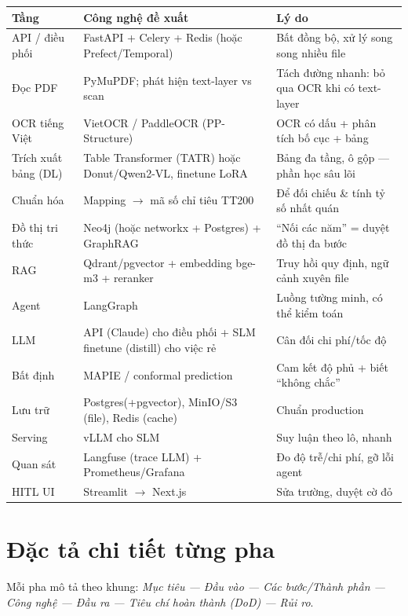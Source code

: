 \documentclass[11pt,a4paper]{article}
\begin{document}
\renewcommand{\arraystretch}{1.25}
\begin{longtable}{>{\raggedright\arraybackslash}p{3.6cm} >{\raggedright\arraybackslash}p{6.4cm} >{\raggedright\arraybackslash}p{5.0cm}}
\toprule
\textbf{Tầng} & \textbf{Công nghệ đề xuất} & \textbf{Lý do} \\
\midrule
\endhead
API / điều phối & FastAPI + Celery + Redis (hoặc Prefect/Temporal) & Bất đồng bộ, xử lý song song nhiều file \\
Đọc PDF & PyMuPDF; phát hiện text-layer vs scan & Tách đường nhanh: bỏ qua OCR khi có text-layer \\
OCR tiếng Việt & VietOCR / PaddleOCR (PP-Structure) & OCR có dấu + phân tích bố cục + bảng \\
Trích xuất bảng (DL) & Table Transformer (TATR) hoặc Donut/Qwen2-VL, finetune LoRA & Bảng đa tầng, ô gộp --- phần học sâu lõi \\
Chuẩn hóa & Mapping $\rightarrow$ mã số chỉ tiêu TT200 & Để đối chiếu \& tính tỷ số nhất quán \\
Đồ thị tri thức & Neo4j (hoặc networkx + Postgres) + GraphRAG & ``Nối các năm'' = duyệt đồ thị đa bước \\
RAG & Qdrant/pgvector + embedding bge-m3 + reranker & Truy hồi quy định, ngữ cảnh xuyên file \\
Agent & LangGraph & Luồng tường minh, có thể kiểm toán \\
LLM & API (Claude) cho điều phối + SLM finetune (distill) cho việc rẻ & Cân đối chi phí/tốc độ \\
Bất định & MAPIE / conformal prediction & Cam kết độ phủ + biết ``không chắc'' \\
Lưu trữ & Postgres(+pgvector), MinIO/S3 (file), Redis (cache) & Chuẩn production \\
Serving & vLLM cho SLM & Suy luận theo lô, nhanh \\
Quan sát & Langfuse (trace LLM) + Prometheus/Grafana & Đo độ trễ/chi phí, gỡ lỗi agent \\
HITL UI & Streamlit $\rightarrow$ Next.js & Sửa trường, duyệt cờ đỏ \\
\bottomrule
\end{longtable}

\section{Đặc tả chi tiết từng pha}

Mỗi pha mô tả theo khung: \emph{Mục tiêu --- Đầu vào --- Các bước/Thành phần --- Công nghệ --- Đầu ra --- Tiêu chí hoàn thành (DoD) --- Rủi ro}.
\end{document}
